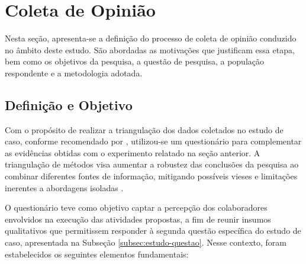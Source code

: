 \section{Coleta de Opinião}
\label{subsec:opiniao}


Nesta seção, apresenta-se a definição do processo de coleta de opinião conduzido no âmbito deste estudo. São abordadas as motivações que justificam essa etapa, bem como os objetivos da pesquisa, a questão de pesquisa, a população respondente e a metodologia adotada.

\subsection{Definição e Objetivo}

Com o propósito de realizar a triangulação dos dados coletados no estudo de caso, conforme recomendado por , utilizou-se um questionário para complementar as evidências obtidas com o experimento relatado na seção anterior. A triangulação de métodos visa aumentar a robustez das conclusões da pesquisa ao combinar diferentes fontes de informação, mitigando possíveis vieses e limitações inerentes a abordagens isoladas \cite{wohlin_experimentation_2012}. 

O questionário teve como objetivo captar a percepção dos colaboradores envolvidos na execução das atividades propostas, a fim de reunir insumos qualitativos que permitissem responder à segunda questão específica do estudo de caso, apresentada na Subseção \ref{subsec:estudo-questao}. Nesse contexto, foram estabelecidos os seguintes elementos fundamentais:

